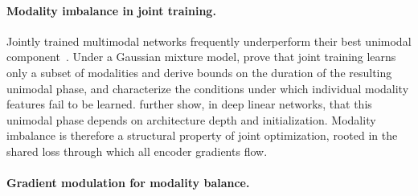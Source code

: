 \documentclass{article} %
\begin{document}
\paragraph{Modality imbalance in joint training.}

Jointly trained multimodal networks frequently underperform their best unimodal component~\citep{wang2020gblending}. Under a Gaussian mixture model, \citet{huang2022modality} prove that joint training learns only a subset of modalities and derive bounds on the duration of the resulting unimodal phase, and \citet{du2023suppression} characterize the conditions under which individual modality features fail to be learned. \citet{zhang2024unimodal} further show, in deep linear networks, that this unimodal phase depends on architecture depth and initialization. Modality imbalance is therefore a structural property of joint optimization, rooted in the shared loss through which all encoder gradients flow.


\paragraph{Gradient modulation for modality balance.}
\end{document}
